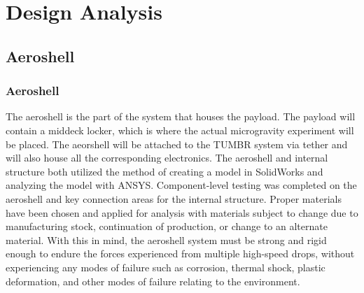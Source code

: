 


\section{Design Analysis}

\subsection{Aeroshell}

\subsubsection{Aeroshell}

\indent\indent The aeroshell is the part of the system that houses the payload. The payload will contain a middeck locker, which is where the actual microgravity experiment will be placed. The aeorshell will be attached to the TUMBR system via tether and will also house all the corresponding electronics. The aeroshell and internal structure both utilized the method of creating a model in SolidWorks and analyzing the model with ANSYS. Component-level testing was completed on the aeroshell and key connection areas for the internal structure. Proper materials have been chosen and applied for analysis with materials subject to change due to manufacturing stock, continuation of production, or change to an alternate material. With this in mind, the aeroshell system must be strong and rigid enough to endure the forces experienced from multiple high-speed drops, without experiencing any modes of failure such as corrosion, thermal shock, plastic deformation, and other modes of failure relating to the environment.

